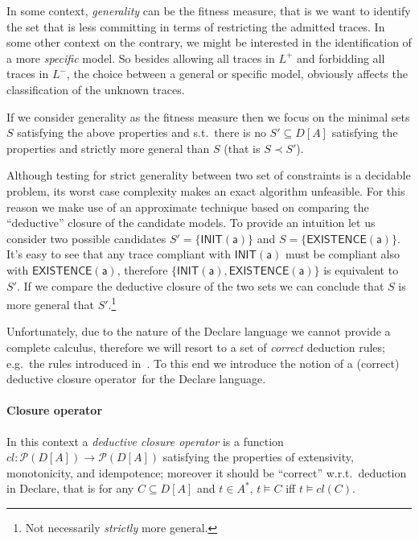 In some context, \emph{generality} can be the fitness measure, that is we want to identify the set that is less committing in terms of restricting the admitted traces. In some other context on the contrary, we might be interested in the identification of a more \emph{specific} model. So besides allowing all traces in $L^+$ and forbidding all traces in $L^-$, the choice between a general or specific model, obviously affects the classification of the unknown traces.

If we consider generality as the fitness measure then we focus on the minimal sets $S$ satisfying the above properties and s.t.\ there is no $S'\subseteq D[A]$ satisfying the properties and strictly more general than $S$ (that is $S\prec S'$).

Although testing for strict generality between two set of constraints is a decidable problem, its worst case complexity makes an exact algorithm unfeasible. For this reason we make use of an approximate technique based on comparing the ``deductive'' closure of the candidate models. 
%
To provide an intuition let us consider two possible candidates $S' = \{\mathsf{INIT(a)}\}$ and $S = \{\mathsf{EXISTENCE(a)}\}$. It's easy to see that any trace compliant with $\mathsf{INIT(a)}$ must be compliant also with $\mathsf{EXISTENCE(a)}$, therefore $\{\mathsf{INIT(a), EXISTENCE(a)}\}$ is equivalent to $S'$. If we compare the deductive closure of the two sets we can conclude that $S$ is more general that $S'$.\footnote{Not necessarily \emph{strictly} more general.}

Unfortunately, due to the nature of the Declare language we cannot provide a complete calculus, therefore we will resort to a set of \emph{correct} deduction rules; e.g.\ the rules introduced in~\cite{???}. To this end we introduce the notion of a (correct) deductive closure operator~for the Declare language.

\paragraph{Closure operator} In this context a \emph{deductive closure operator} is a function $cl: \mathcal{P}(D[A])\rightarrow\mathcal{P}(D[A])$ satisfying the properties of extensivity, monotonicity, and idempotence; moreover it should be ``correct'' w.r.t.\ deduction in Declare, that is for any $C\subseteq D[A]$ and $t\in A^*$, $t\models C$ iff $t\models cl(C)$.

